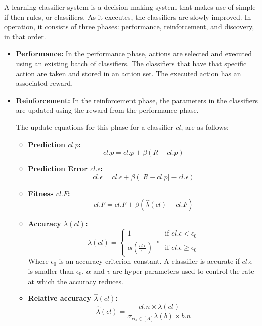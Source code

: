 \documentclass[12pt]{article} %
\begin{document}
    A learning classifier system is a decision making system that makes use of simple if-then rules, or classifiers. As it executes, the classifiers are slowly improved. In operation, it consists of three phases: performance, reinforcement, and discovery, in that order. 
    \begin{itemize}
        \item \textbf{Performance:} In the performance phase, actions are selected and executed using an existing batch of classifiers. The classifiers that have that specific action are taken and stored in an action set. The executed action has an associated reward.
        
        \item \textbf{Reinforcement:} In the reinforcement phase, the parameters in the classifiers are updated using the reward from the performance phase. 
        
        The update equations for this phase for a classifier $cl$, are as follows: 
        \begin{itemize}
            \item \textbf{Prediction $cl.p$: } 
                \begin{equation}
                    cl.p = cl.p + \beta(R-cl.p)
                \end{equation}
            \item \textbf{Prediction Error $cl.\epsilon$: } 
                \begin{equation}
                    cl.\epsilon = cl.\epsilon + \beta(|R-cl.p| - cl.\epsilon)
                \end{equation}
            \item \textbf{Fitness $cl.F$: } 
                \begin{equation}
                    cl.F = cl.F + \beta(\hat{\lambda}(cl) - cl.F)
                \end{equation}
            \item \textbf{Accuracy $\lambda(cl)$: }
                \begin{equation}
                    \lambda (cl) = 
                        \begin{cases}
                            1 & \text{if } cl.\epsilon < \epsilon_0 \\
                            \alpha(\frac{cl.\epsilon}{\epsilon_0})^{-v} & \text{if } cl.\epsilon \geq \epsilon_0
                        \end{cases}
                \end{equation}
               Where $\epsilon_0$ is an accuracy criterion constant. A classifier is accurate if $cl.\epsilon$ is smaller than $\epsilon_0$. $\alpha$ and $v$ are hyper-parameters used to control the rate at which the accuracy reduces. 
            \item \textbf{Relative accuracy $\hat{\lambda}(cl)$: }
                \begin{equation}
                    \hat{\lambda}(cl) = \frac{cl.n \times \lambda(cl)}{\sigma_{cl_b \in [A]} \lambda(b) \times b.n}
                \end{equation}
        \end{itemize}


\end{itemize}
\end{document}
